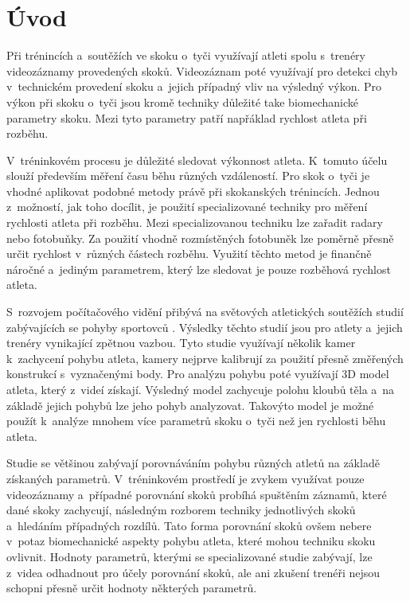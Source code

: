 \chapter*{Úvod}

Při trénincích a~soutěžích ve skoku o~tyči využívají atleti spolu s~trenéry videozáznamy provedených skoků. Videozáznam poté využívají pro detekci chyb v~technickém provedení skoku a~jejich případný vliv na výsledný výkon. Pro výkon při skoku o~tyči jsou kromě techniky důležité take biomechanické parametry skoku. Mezi tyto parametry patří napřáklad rychlost atleta při rozběhu.

V~tréninkovém procesu je důležité sledovat výkonnost atleta. K~tomuto účelu slouží především měření času běhu různých vzdáleností. Pro skok o~tyči je vhodné aplikovat podobné metody právě při skokanských trénincích. Jednou z~možností, jak toho docílit, je použití specializované techniky pro měření rychlosti atleta při rozběhu. Mezi specializovanou techniku lze zařadit radary nebo fotobuňky. Za použití vhodně rozmístěných fotobuněk lze poměrně přesně určit rychlost v~různých částech rozběhu. Využití těchto metod je finančně náročné a~jediným parametrem, který lze sledovat je pouze rozběhová rychlost atleta.

S~rozvojem počítačového vidění přibývá na světových atletických soutěžích studií zabývajících se pohyby sportovců \citep{IAAFBR}. Výsledky těchto studií jsou pro atlety a~jejich trenéry vynikající zpětnou vazbou. Tyto studie využívají několik kamer k~zachycení pohybu atleta, kamery nejprve kalibrují za použití přesně změřených konstrukcí s~vyznačenými body. Pro analýzu pohybu poté využívají 3D model atleta, který z~videí získají. Výsledný model zachycuje polohu kloubů těla a~na základě jejich pohybů lze jeho pohyb analyzovat. Takovýto model je možné použít k~analýze mnohem více parametrů skoku o~tyči než jen rychlosti běhu atleta.

Studie se většinou zabývají porovnáváním pohybu různých atletů na základě získaných parametrů. V~tréninkovém prostředí je zvykem využívat pouze videozáznamy a~případné porovnání skoků probíhá spuštěním záznamů, které dané skoky zachycují, následným rozborem techniky jednotlivých skoků a~hledáním případných rozdílů. Tato forma porovnání skoků ovšem nebere v~potaz biomechanické aspekty pohybu atleta, které mohou techniku skoku ovlivnit. Hodnoty parametrů, kterými se specializované studie zabývají, lze z~videa odhadnout pro účely porovnání skoků, ale ani zkušení trenéři nejsou schopni přesně určit hodnoty některých parametrů.


